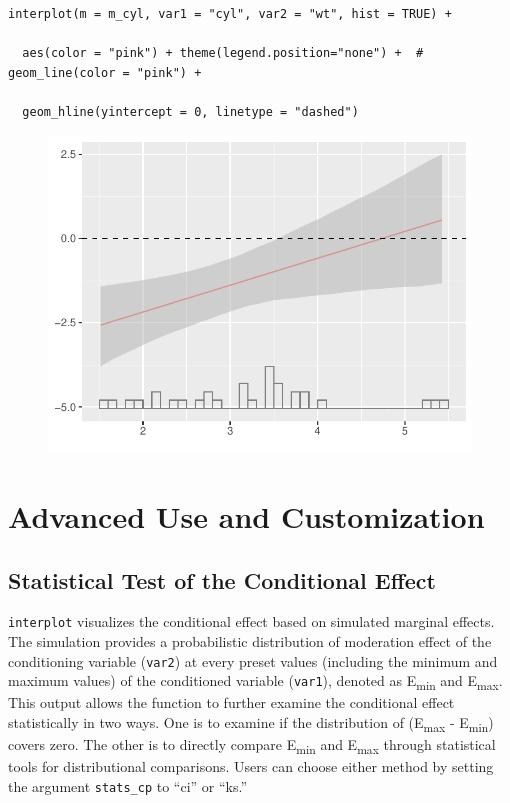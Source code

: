 \documentclass[
  article]{jss}
\begin{document}
\begin{verbatim}
interplot(m = m_cyl, var1 = "cyl", var2 = "wt", hist = TRUE) +

  aes(color = "pink") + theme(legend.position="none") +  # geom_line(color = "pink") + 
  
  geom_hline(yintercept = 0, linetype = "dashed")
\end{verbatim}

\begin{figure}[H]

{\centering \includegraphics{jss_manuscript_files/figure-pdf/unnamed-chunk-13-1.pdf}

}

\end{figure}

\hypertarget{sec-advanced-use-and-customization}{%
\section{Advanced Use and
Customization}\label{sec-advanced-use-and-customization}}

\hypertarget{sec-statistical-test-of-the-conditional-effect}{%
\subsection{Statistical Test of the Conditional
Effect}\label{sec-statistical-test-of-the-conditional-effect}}

\texttt{interplot} visualizes the conditional effect based on simulated
marginal effects. The simulation provides a probabilistic distribution
of moderation effect of the conditioning variable (\texttt{var2}) at
every preset values (including the minimum and maximum values) of the
conditioned variable (\texttt{var1}), denoted as E\textsubscript{min}
and E\textsubscript{max}. This output allows the function to further
examine the conditional effect statistically in two ways. One is to
examine if the distribution of (E\textsubscript{max} -
E\textsubscript{min}) covers zero. The other is to directly compare
E\textsubscript{min} and E\textsubscript{max} through statistical tools
for distributional comparisons. Users can choose either method by
setting the argument \texttt{stats\_cp} to ``ci'' or ``ks.''
\end{document}
